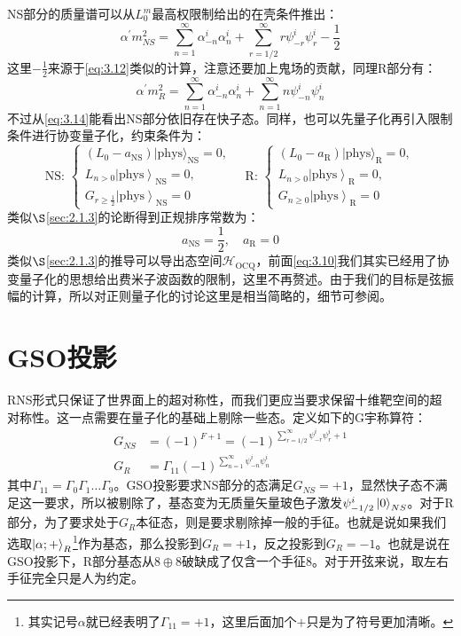NS部分的质量谱可以从$L_0^m$最高权限制给出的在壳条件推出：
\begin{equation}
	\label{eq:3.14}
	\alpha^{\prime}m^2_{NS}=\sum_{n=1}^\infty\alpha_{-n}^i\alpha_n^i+\sum_{r=1/2}^\infty r\psi_{-r}^i\psi_r^i-\frac{1}{2}
\end{equation}
这里$-\frac12$来源于\ref{eq:3.12}类似的计算，注意还要加上鬼场的贡献，同理R部分有：
\begin{equation}
	\alpha^{\prime}m^2_{R}=\sum_{n=1}^\infty\alpha_{-n}^i\alpha_n^i+\sum_{n=1}^\infty n\psi_{-n}^i \psi_n^i
\end{equation}
不过从\ref{eq:3.14}能看出NS部分依旧存在快子态。同样，也可以先量子化再引入限制条件进行协变量子化，约束条件为：
\begin{equation}
	\text{NS: }\begin{cases}
		\left(L_{0}-a_{{\mathrm{NS}}}\right)|\text{phys}\rangle_{{\mathrm{NS}}}=0,\\
		L_{n>0}\left|\text{phys}\right\rangle_{\mathrm{NS}}=0,\\
		G_{r\geq\frac12}\left|\text{phys}\right\rangle_{\mathrm{NS}}=0
	\end{cases}
	\quad
	\text{R: }
	\begin{cases}
		\left(L_0-a_\mathrm{R}\right)|\text{phys}\rangle_\mathrm{R}=0,\\
		L_{n>0}\left|\text{phys}\right\rangle_{\mathrm{R}}=0,\\
		G_{n\geq0}\left|\text{phys}\right\rangle_{\mathrm{R}}=0
	\end{cases}
\end{equation}
类似$\S$\ref{sec:2.1.3}的论断得到正规排序常数为：
\begin{equation}
	a_{\mathrm{NS}} = \frac12,\quad a_{\mathrm{R}}=0
\end{equation}
类似$\S$\ref{sec:2.1.3}的推导可以导出态空间$\mathscr{H}_{\mathrm{OCQ}}$，前面\ref{eq:3.10}我们其实已经用了协变量子化的思想给出费米子波函数的限制，这里不再赘述。由于我们的目标是弦振幅的计算，所以对正则量子化的讨论这里是相当简略的，细节可参阅\cite{Green:2012pqa}。
\section{GSO投影}
RNS形式只保证了世界面上的超对称性，而我们更应当要求保留十维靶空间的超对称性。这一点需要在量子化的基础上剔除一些态。定义如下的G宇称算符：
\begin{equation}
\begin{aligned}
		G_{NS}&=(-1)^{F+1}=(-1)^{\sum_{r=1/2}^\infty \psi_{-r}^i\psi_r^i+1}\\
	G_R&=\Gamma_{11}(-1)^{\sum_{n=1}^\infty \psi_{-n}^i\psi_n^i}
\end{aligned}
\end{equation}
其中$\Gamma_{11}=\Gamma_{0}\Gamma_{1}\ldots\Gamma_{9}$。GSO投影要求NS部分的态满足$G_{NS}=+1$，显然快子态不满足这一要求，所以被剔除了，基态变为无质量矢量玻色子激发$\psi^i_{-1/2}\ket{0}_{NS}$。对于R部分，为了要求处于$G_R$本征态，则是要求剔除掉一般的手征。也就是说如果我们选取$\ket{\alpha;+}_R$\footnote{其实记号$\alpha$就已经表明了$\Gamma_{11}=+1$，这里后面加个$+$只是为了符号更加清晰。}作为基态，那么投影到$G_R=+1$，反之投影到$G_R=-1$。也就是说在GSO投影下，R部分基态从$8\oplus 8$破缺成了仅含一个手征$8$。对于开弦来说，取左右手征完全只是人为约定。

